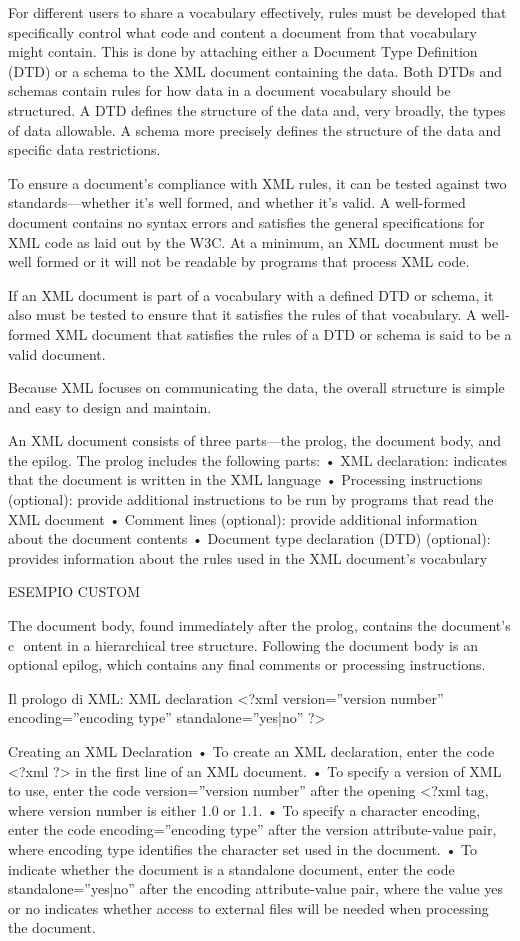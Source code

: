For different users to share a vocabulary effectively, rules must be developed that
specifically control what code and content a document from that vocabulary might
contain. This is done by attaching either a Document Type Definition (DTD) or a
schema to the XML document containing the data. Both DTDs and schemas contain
rules for how data in a document vocabulary should be structured. A DTD defines the
structure of the data and, very broadly, the types of data allowable. A schema more
precisely defines the structure of the data and specific data restrictions.

To ensure a document’s compliance with XML rules, it can be tested against two
standards—whether it’s well formed, and whether it’s valid. A well-formed document
contains no syntax errors and satisfies the general specifications for XML code as laid
out by the W3C. At a minimum, an XML document must be well formed or it will not
be readable by programs that process XML code.

If an XML document is part of a vocabulary with a defined DTD or schema, it also
must be tested to ensure that it satisfies the rules of that vocabulary. A well-formed XML
document that satisfies the rules of a DTD or schema is said to be a valid document.

Because XML focuses on
communicating the data, the overall structure is simple and easy to design and
maintain.

An XML document consists of three parts—the prolog, the document body, and the
epilog. The prolog includes the following parts:
• XML declaration: indicates that the document is written in the XML language
• Processing instructions (optional): provide additional instructions to be run by
programs that read the XML document
• Comment lines (optional): provide additional information about the document
contents
• Document type declaration (DTD) (optional): provides information about the rules
used in the XML document’s vocabulary

ESEMPIO CUSTOM


The document body, found immediately after the prolog, contains the document’s
c ­ ontent in a hierarchical tree structure. Following the document body is an optional
e­pilog, which contains any final comments or processing instructions.

Il prologo di XML: XML declaration 
<?xml version=”version number” encoding=”encoding type”
standalone=”yes|no” ?>

Creating an XML Declaration
• To create an XML declaration, enter the code
<?xml ?>
in the first line of an XML document.
• To specify a version of XML to use, enter the code
version=”version number”
after the opening <?xml tag, where version number is either 1.0 or 1.1.
• To specify a character encoding, enter the code
encoding=”encoding type”
after the version attribute-value pair, where encoding type identifies the ­character
set used in the document.
• To indicate whether the document is a standalone document, enter the code
standalone=”yes|no”
after the encoding attribute-value pair, where the value yes or no ­indicates whether
access to external files will be needed when processing the document.


